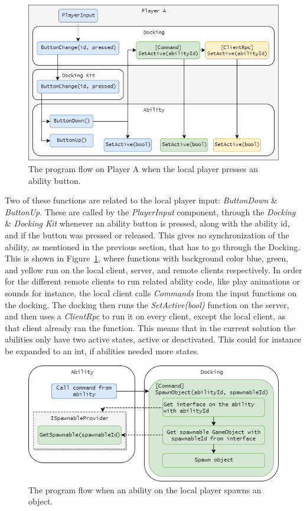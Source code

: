 \begin{figure}[tbph]
  \centering
  \includegraphics[width=.9\textwidth]{images/CommandSetActive}
  \caption[Program flow on ability button pressed]{The program flow on Player A when the local player presses an ability button.}
  \label{fig:commandSetActive}
\end{figure}

Two of these functions are related to the local player input: \emph{ButtonDown} \& \emph{ButtonUp}. These are called by the \emph{PlayerInput} component, through the \emph{Docking} \& \emph{Docking Kit} whenever an ability button is pressed, along with the ability id, and if the button was pressed or released. This gives no synchronization of the ability, as mentioned in the previous section, that has to go through the Docking. This is shown in Figure~\ref{fig:commandSetActive}, where functions with background color blue, green, and yellow run on the local client, server, and remote clients respectively. In order for the different remote clients to run related ability code, like play animations or sounds for instance, the local client calls \emph{Commands} from the input functions on the docking. The docking then runs the \emph{SetActive(bool)} function on the server, and then uses a \emph{ClientRpc} to run it on every client, except the local client, as that client already ran the function. This means that in the current solution the abilities only have two active states, active or deactivated. This could for instance be expanded to an int, if abilities needed more states.

\begin{figure}[tbph]
  \centering
  \includegraphics[width=.9\textwidth]{images/SpawnObject}
  \caption[Program flow on ability spawning object]{The program flow when an ability on the local player spawns an object.}
  \label{fig:spawnObject}
\end{figure}

